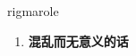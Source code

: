
\begin{frame}
{\huge rigmarole}
\begin{center}
\begin{enumerate}\Large
  \item \textbf{混乱而无意义的话}
\end{enumerate}
\end{center}
\end{frame}
